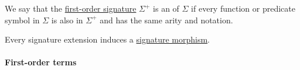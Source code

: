 \begin{definition}\label{def:fol_signature_extension}
  We say that the \hyperref[def:fol_signature]{first-order signature} \( \Sigma^+ \) is an  of \( \Sigma \) if every function or predicate symbol in \( \Sigma \) is also in \( \Sigma^+ \) and has the same arity and notation.
\end{definition}
\begin{comments}
  \item Every signature extension induces a \hyperref[def:fol_signature_category/morphisms]{signature morphism}.
\end{comments}

\paragraph{First-order terms}

